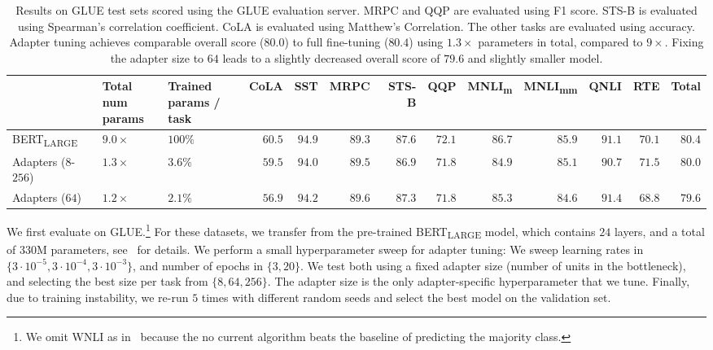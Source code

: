 \begin{table}[t]
\centering
\begin{adjustbox}{max width=\textwidth}
\begin{tabular}{l|ll|rrrrrrrrr|r}
\toprule
{} & \pbox{3cm}{Total num\\ params} & \pbox{3cm}{Trained \\ params / task} & CoLA &     SST &    MRPC &   STS-B &     QQP & MNLI\textsubscript{m} & MNLI\textsubscript{mm} &    QNLI &     RTE &   Total \\
\midrule
BERT\textsubscript{LARGE} &  $9.0\times$ &   $100\%$ &  $60.5$ &  $94.9$ &  $89.3$ &  $87.6$ &  $72.1$ &  $86.7$ &  $85.9$ &  $91.1$ &  $70.1$ &  $80.4$ \\
Adapters ($8$-$256$)      &  $1.3\times$ &   $3.6\%$ &  $59.5$ &  $94.0$ &  $89.5$ &  $86.9$ &  $71.8$ &  $84.9$ &  $85.1$ &  $90.7$ &  $71.5$ &  $80.0$ \\
Adapters ($64$)           &  $1.2\times$ &   $2.1\%$ &  $56.9$ &  $94.2$ &  $89.6$ &  $87.3$ &  $71.8$ &  $85.3$ &  $84.6$ &  $91.4$ &  $68.8$ &  $79.6$ \\
\bottomrule
\end{tabular}
\end{adjustbox}
\caption{
Results on GLUE test sets scored using the GLUE evaluation server.
MRPC and QQP are evaluated using F1 score.
STS-B is evaluated using Spearman's correlation coefficient.
CoLA is evaluated using Matthew's Correlation.
The other tasks are evaluated using accuracy.
Adapter tuning achieves comparable overall score ($80.0$) to full fine-tuning ($80.4$) using $1.3\times$ parameters in total, compared to $9\times$.
Fixing the adapter size to $64$ leads to a slightly decreased overall score of $79.6$ and slightly smaller model.
\label{tab:glue}}
\end{table}

We first evaluate on GLUE.\footnote{
We omit WNLI as in~\citet{devlin2018bert} because the no current algorithm beats the baseline of predicting the majority class.}
For these datasets, we transfer from the pre-trained BERT\textsubscript{LARGE} model,
which contains $24$ layers, and a total of $330$M parameters, see~\citet{devlin2018bert} for details.
We perform a small hyperparameter sweep for adapter tuning:
We sweep learning rates in $\{3 \cdot 10^{-5}, 3 \cdot 10^{-4}, 3 \cdot 10^{-3}\}$, and number of epochs in $\{3, 20\}$.
We test both using a fixed adapter size (number of units in the bottleneck),
and selecting the best size per task from $\{8, 64, 256\}$.
The adapter size is the only adapter-specific hyperparameter that we tune.
Finally, due to training instability, we re-run $5$ times with different random seeds and select the best model on the validation set.


